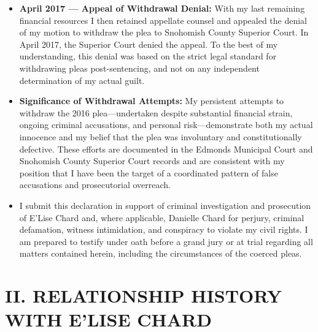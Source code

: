 \documentclass[12pt,letterpaper]{article}
\begin{document}
\begin{enumerate}
\begin{itemize}
\item \textbf{April 2017 --- Appeal of Withdrawal Denial:} With my last remaining financial resources I then retained appellate counsel and appealed the denial of my motion to withdraw the plea to Snohomish County Superior Court. In April 2017, the Superior Court denied the appeal. To the best of my understanding, this denial was based on the strict legal standard for withdrawing pleas post-sentencing, and not on any independent determination of my actual guilt.

\item \textbf{Significance of Withdrawal Attempts:} My persistent attempts to withdraw the 2016 plea---undertaken despite substantial financial strain, ongoing criminal accusations, and personal risk---demonstrate both my actual innocence and my belief that the plea was involuntary and constitutionally defective. These efforts are documented in the Edmonds Municipal Court and Snohomish County Superior Court records and are consistent with my position that I have been the target of a coordinated pattern of false accusations and prosecutorial overreach.

\item I submit this declaration in support of criminal investigation and prosecution of E'Lise Chard and, where applicable, Danielle Chard for perjury, criminal defamation, witness intimidation, and conspiracy to violate my civil rights. I am prepared to testify under oath before a grand jury or at trial regarding all matters contained herein, including the circumstances of the coerced pleas.

\end{itemize}
\end{enumerate}

\section*{II. RELATIONSHIP HISTORY WITH E'LISE CHARD}
\end{document}
